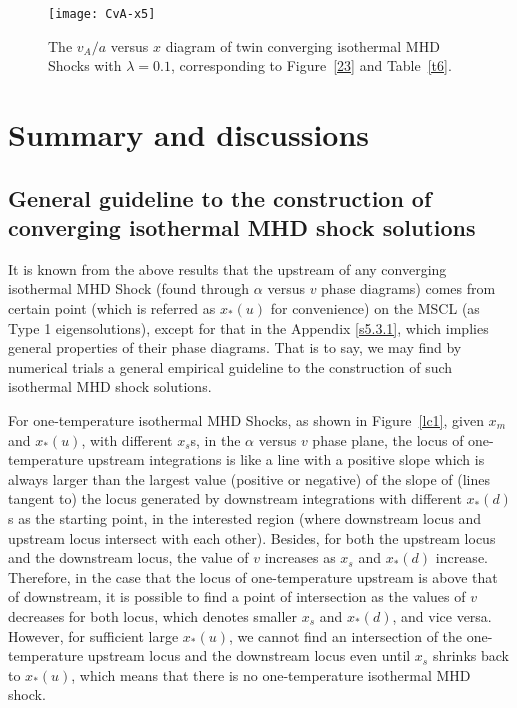 \documentclass[fleqn,usenatbib]{mnras}
\begin{document}
\begin{figure}
\centering
\texttt{[image: CvA-x5]}
\caption{The $v_{A}/a$ versus $x$ diagram of twin converging isothermal MHD Shocks with $\lambda=0.1$, corresponding to Figure~\ref{23} and Table~\ref{t6}.}
\label{26}
\end{figure}


\section{Summary and discussions}
\label{s6}
\subsection{General guideline to the construction of converging isothermal MHD shock solutions}
\label{s6.1}
It is known from the above results that the upstream of any converging isothermal MHD Shock (found through $\alpha$ versus $v$ phase diagrams) comes from certain point (which is referred as $x_{*}(u)$ for convenience) on the MSCL (as Type 1 eigensolutions), except for that in the Appendix \ref{s5.3.1}, which implies general properties of their phase diagrams. That is to say, we may find by numerical trials a general empirical guideline to the construction of such isothermal MHD shock solutions. 

For one-temperature isothermal MHD Shocks, as shown in Figure~\ref{lc1}, given $x_{m}$ and $x_{*}(u)$, with different $x_{s}$s, in the $\alpha$ versus $v$ phase plane, the locus of one-temperature upstream integrations is like a line with a positive slope which is always larger than the largest value (positive or negative) of the slope of (lines tangent to) the locus generated by downstream integrations with different $x_{*}(d)$s as the starting point, in the interested region (where downstream locus and upstream locus intersect with each other). Besides, for both the upstream locus and the downstream locus, the value of $v$ increases as $x_{s}$ and $x_{*}(d)$ increase. 
Therefore, in the case that the locus of one-temperature upstream is above that of downstream, it is possible to find a point of intersection as the values of $v$ decreases for both locus, which denotes smaller $x_{s}$ and $x_{*}(d)$, and vice versa. However, for sufficient large $x_{*}(u)$, we cannot find an intersection of the one-temperature upstream locus and the downstream locus even until $x_{s}$ shrinks back to $x_{*}(u)$, which means that there is no one-temperature isothermal MHD shock. 
\end{document}
